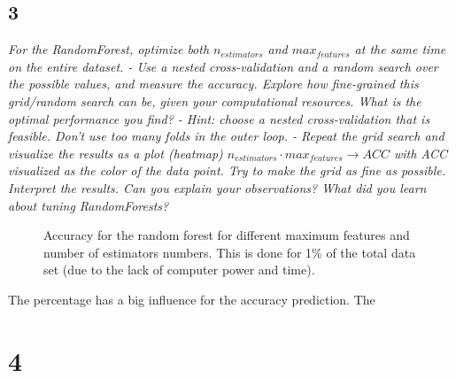 \documentclass[a4paper,12pt]{article}
\begin{document}
{\subsection*{3}
{\it For the RandomForest, optimize both $n_{estimators}$ and $max_{features}$ at the same time on the entire dataset. - Use a nested cross-validation and a random search over the possible values, and measure the accuracy. Explore how fine-grained this grid/random search can be, given your computational resources. What is the optimal performance you find? - Hint: choose a nested cross-validation that is feasible. Don’t use too many folds in the outer loop. - Repeat the grid search and visualize the results as a plot (heatmap) $n_{estimators}\cdot max_{features} \rightarrow ACC$ with ACC visualized as the color of the data point. Try to make the grid as fine as possible. Interpret the results. Can you explain your observations? What did you learn about tuning RandomForests?}
\begin{figure}[H]
\hfill
{}
\hfill
\caption{Accuracy for the random forest for different maximum features and number of estimators numbers. This is done for 1\% of the total data set (due to the lack of computer power and time).}
\label{•}
\end{figure}
The percentage has a big influence for the accuracy prediction. The 

\section*{4}
}
\end{document}

